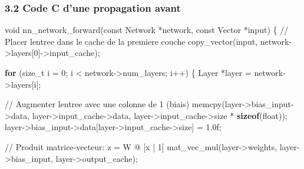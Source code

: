 \documentclass[
  letterpaper,
  DIV=11,
  numbers=noendperiod]{scrartcl}
\newenvironment{Shaded}{\begin{snugshade}}{\end{snugshade}}
\newcommand{\BuiltInTok}[1]{\textcolor[rgb]{0.00,0.23,0.31}{#1}}
\newcommand{\CommentTok}[1]{\textcolor[rgb]{0.37,0.37,0.37}{#1}}
\newcommand{\ControlFlowTok}[1]{\textcolor[rgb]{0.00,0.23,0.31}{\textbf{#1}}}
\newcommand{\DataTypeTok}[1]{\textcolor[rgb]{0.68,0.00,0.00}{#1}}
\newcommand{\DecValTok}[1]{\textcolor[rgb]{0.68,0.00,0.00}{#1}}
\newcommand{\FloatTok}[1]{\textcolor[rgb]{0.68,0.00,0.00}{#1}}
\newcommand{\KeywordTok}[1]{\textcolor[rgb]{0.00,0.23,0.31}{\textbf{#1}}}
\newcommand{\NormalTok}[1]{\textcolor[rgb]{0.00,0.23,0.31}{#1}}
\newcommand{\OperatorTok}[1]{\textcolor[rgb]{0.37,0.37,0.37}{#1}}
\begin{document}
\subsubsection{3.2 Code C d'une propagation avant}\label{code-c-forward}

\begin{Shaded}
\begin{Highlighting}[]
\DataTypeTok{void}\NormalTok{ nn\_network\_forward}\OperatorTok{(}\DataTypeTok{const}\NormalTok{ Network }\OperatorTok{*}\NormalTok{network}\OperatorTok{,} \DataTypeTok{const}\NormalTok{ Vector }\OperatorTok{*}\NormalTok{input}\OperatorTok{)} \OperatorTok{\{}
    \CommentTok{// Placer l\textquotesingle{}entree dans le cache de la premiere couche}
\NormalTok{    copy\_vector}\OperatorTok{(}\NormalTok{input}\OperatorTok{,}\NormalTok{ network}\OperatorTok{{-}\textgreater{}}\NormalTok{layers}\OperatorTok{[}\DecValTok{0}\OperatorTok{]{-}\textgreater{}}\NormalTok{input\_cache}\OperatorTok{);}

    \ControlFlowTok{for} \OperatorTok{(}\DataTypeTok{size\_t}\NormalTok{ i }\OperatorTok{=} \DecValTok{0}\OperatorTok{;}\NormalTok{ i }\OperatorTok{\textless{}}\NormalTok{ network}\OperatorTok{{-}\textgreater{}}\NormalTok{num\_layers}\OperatorTok{;}\NormalTok{ i}\OperatorTok{++)} \OperatorTok{\{}
\NormalTok{        Layer }\OperatorTok{*}\NormalTok{layer }\OperatorTok{=}\NormalTok{ network}\OperatorTok{{-}\textgreater{}}\NormalTok{layers}\OperatorTok{[}\NormalTok{i}\OperatorTok{];}

        \CommentTok{// Augmenter l\textquotesingle{}entree avec une colonne de 1 (biais)}
\NormalTok{        memcpy}\OperatorTok{(}\NormalTok{layer}\OperatorTok{{-}\textgreater{}}\NormalTok{bias\_input}\OperatorTok{{-}\textgreater{}}\NormalTok{data}\OperatorTok{,}\NormalTok{ layer}\OperatorTok{{-}\textgreater{}}\NormalTok{input\_cache}\OperatorTok{{-}\textgreater{}}\NormalTok{data}\OperatorTok{,}
\NormalTok{               layer}\OperatorTok{{-}\textgreater{}}\NormalTok{input\_cache}\OperatorTok{{-}\textgreater{}}\NormalTok{size }\OperatorTok{*} \KeywordTok{sizeof}\OperatorTok{(}\DataTypeTok{float}\OperatorTok{));}
\NormalTok{        layer}\OperatorTok{{-}\textgreater{}}\NormalTok{bias\_input}\OperatorTok{{-}\textgreater{}}\NormalTok{data}\OperatorTok{[}\NormalTok{layer}\OperatorTok{{-}\textgreater{}}\NormalTok{input\_cache}\OperatorTok{{-}\textgreater{}}\NormalTok{size}\OperatorTok{]} \OperatorTok{=} \FloatTok{1.0}\BuiltInTok{f}\OperatorTok{;}

        \CommentTok{// Produit matrice-vecteur: z = W @ [x | 1]}
\NormalTok{        mat\_vec\_mul}\OperatorTok{(}\NormalTok{layer}\OperatorTok{{-}\textgreater{}}\NormalTok{weights}\OperatorTok{,}\NormalTok{ layer}\OperatorTok{{-}\textgreater{}}\NormalTok{bias\_input}\OperatorTok{,}\NormalTok{ layer}\OperatorTok{{-}\textgreater{}}\NormalTok{output\_cache}\OperatorTok{);}


\end{Highlighting}
\end{Shaded}
\end{document}
